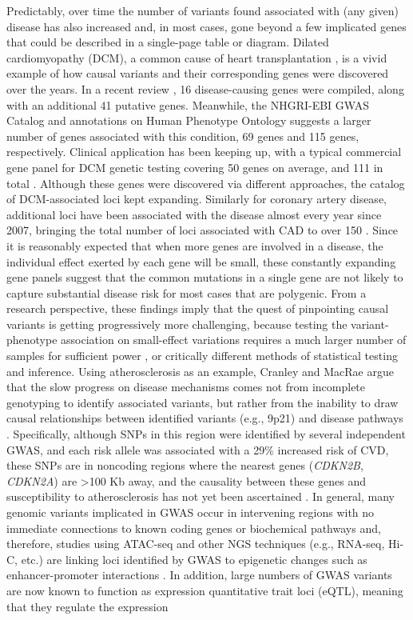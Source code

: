 \documentclass[letter]{bioinfo}
\begin{document}
Predictably, over time the number of variants found associated with (any given) disease has also increased and, in most cases, gone beyond a few implicated genes that could be described in a single-page table or diagram.  Dilated cardiomyopathy (DCM), a common cause of heart transplantation \citep{Burke:2016:Clinical}, is a vivid example of how causal variants and their corresponding genes were discovered over the years.  In a recent review \citep{Burke:2016:Clinical}, 16 disease-causing genes were compiled, along with an additional 41 putative genes.  Meanwhile, the NHGRI-EBI GWAS Catalog \citep{MacArthur:2017:new} and annotations on Human Phenotype Ontology \citep{Kohler:2017:Human} suggests a larger number of genes associated with this condition, 69 genes and 115 genes, respectively. Clinical application has been keeping up, with a typical commercial gene panel for DCM genetic testing covering 50 genes on average, and 111 in total \citep{McNally:2017:Dilated}. Although these genes were discovered via different approaches, the catalog of DCM-associated loci kept expanding. Similarly for coronary artery disease, additional loci have been associated with the disease almost every year since 2007, bringing the total number of loci associated with CAD to over 150 \citep{Clarke:2018:GenomeWide}.  Since it is reasonably expected that when more genes are involved in a disease, the individual effect exerted by each gene will be small, these constantly expanding gene panels suggest that the common mutations in a single gene are not likely to capture substantial disease risk for most cases that are polygenic. From a research perspective, these findings imply that the quest of pinpointing causal variants is getting progressively more challenging, because testing the variant-phenotype association on small-effect variations requires a much larger number of samples for sufficient power \citep{Visscher:2017:10}, or critically different methods of statistical testing and inference.  Using atherosclerosis as an example, Cranley and MacRae \citep{Cranley:2018:New} argue that the slow progress on disease mechanisms comes not from incomplete genotyping to identify associated variants, but rather from the inability to draw causal relationships between identified variants (e.g., 9p21) and disease pathways \citep{Lau:2018:Omics}.  Specifically, although SNPs in this region were identified by several independent GWAS, and each risk allele was associated with a 29\% increased risk of CVD, these SNPs are in noncoding regions where the nearest genes (\emph{CDKN2B}, \emph{CDKN2A}) are >100 Kb away, and the causality between these genes and susceptibility to atherosclerosis has not yet been ascertained \citep{Helgadottir:2007:Common,McPherson:2007:Common,Samani:2007:Genomewide}.  In general, many genomic variants implicated in GWAS occur in intervening regions with no immediate connections to known coding genes or biochemical pathways and, therefore, studies using ATAC-seq and other NGS techniques (e.g., RNA-seq, Hi-C, etc.) are linking loci identified by GWAS to epigenetic changes such as enhancer-promoter interactions \citep{Lau:2018:Omics}.  In addition, large numbers of GWAS variants are now known to function as expression quantitative trait loci (eQTL), meaning that they regulate the expression 
\end{document}
